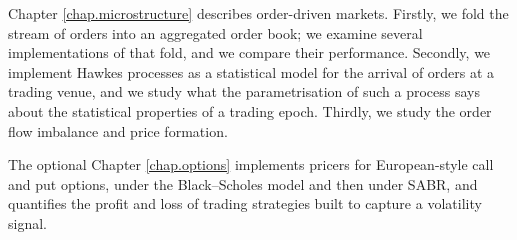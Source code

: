 Chapter \ref{chap.microstructure} describes order-driven markets.
Firstly,
we fold the stream of orders into an aggregated order book;
we examine several implementations of that fold,
and we compare their performance.
Secondly,
we implement Hawkes processes
as a statistical model for the arrival of orders at a trading venue,
and we study what the parametrisation of such a process says
about the statistical properties of a trading epoch.
Thirdly,
we study the order flow imbalance and price formation.

The optional Chapter \ref{chap.options} implements pricers
for European-style call and put options,
under the Black--Scholes model and then under SABR,
and quantifies the profit and loss of trading strategies
built to capture a volatility signal.

